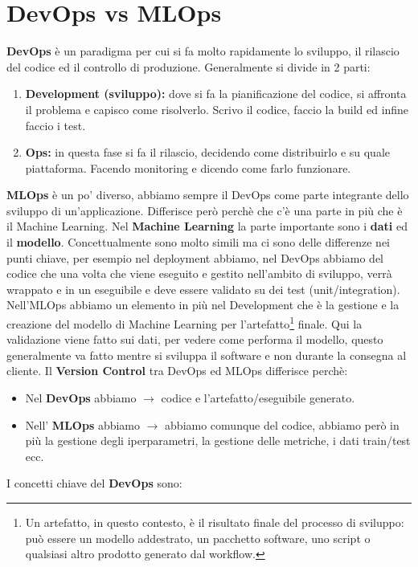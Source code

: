 \documentclass[a4paper,12pt]{article}
\begin{document}
\section{DevOps vs MLOps}
\textbf{DevOps} è un paradigma per cui si fa molto rapidamente lo sviluppo, il rilascio del codice ed il controllo di produzione.
Generalmente si divide in 2 parti:
\begin{enumerate}
    \item \textbf{Development (sviluppo): }dove si fa la pianificazione del codice, si affronta il problema e capisco come risolverlo. Scrivo il codice, faccio la build ed infine faccio i test.
    \item \textbf{Ops: }in questa fase si fa il rilascio, decidendo come distribuirlo e su quale piattaforma. Facendo monitoring e dicendo come farlo funzionare.
\end{enumerate}
\textbf{MLOps} è un po' diverso, abbiamo sempre il DevOps come parte integrante dello sviluppo di un'applicazione. Differisce però perchè che c'è una parte in più che è il Machine Learning.
Nel \textbf{Machine Learning} la parte importante sono i \textbf{dati} ed il \textbf{modello}. 
Concettualmente sono molto simili ma ci sono delle differenze nei punti chiave, per esempio nel deployment abbiamo, nel DevOps abbiamo del codice che una volta che viene eseguito e gestito nell'ambito di sviluppo, verrà wrappato 
e in un eseguibile e deve essere validato su dei test (unit/integration). Nell'MLOps abbiamo un elemento in più nel Development che è la gestione e la creazione del modello di Machine Learning per l'artefatto\footnote{Un artefatto, in questo contesto, è il risultato finale del processo di sviluppo: può essere un modello addestrato, un pacchetto software, uno script o qualsiasi altro prodotto generato dal workflow.} finale.
Qui la validazione viene fatto sui dati, per vedere come performa il modello, questo generalmente va fatto mentre si sviluppa il software e non durante la consegna al cliente.
Il \textbf{Version Control} tra DevOps ed MLOps differisce perchè:
\begin{itemize}
    \item Nel \textbf{DevOps} abbiamo $\rightarrow$ codice e l'artefatto/eseguibile generato.
    \item Nell' \textbf{MLOps} abbiamo $\rightarrow$ abbiamo comunque del codice, abbiamo però in più la gestione degli iperparametri, la gestione delle metriche, i dati train/test ecc.
\end{itemize}
I concetti chiave del \textbf{DevOps} sono:
\end{document}
